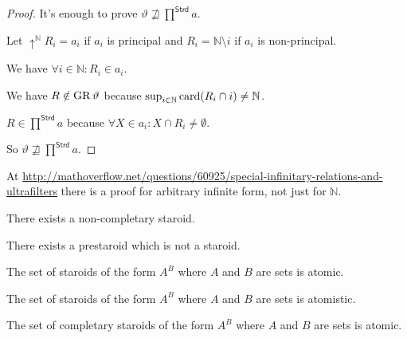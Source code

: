 \begin{proof}
It's enough to prove $\vartheta\nsqsupseteq\prod^{\mathsf{Strd}}a$.

Let $\uparrow^{\mathbb{N}}R_{i}=a_{i}$ if $a_{i}$ is principal and
$R_{i}=\mathbb{N}\setminus i$ if $a_{i}$ is non-principal.

We have $\forall i\in\mathbb{N}:R_{i}\in a_{i}$.

We have $R\notin\operatorname{GR}\vartheta$ because $\sup_{i\in\mathbb{N}}\operatorname{card}(R_{i}\cap i)\neq\mathbb{N}$.

$R\in\prod^{\mathsf{Strd}}a$ because $\forall X\in a_{i}:X\cap R_{i}\neq\emptyset$.

So $\vartheta\nsqsupseteq\prod^{\mathsf{Strd}}a$.\end{proof}
\begin{rem}
At \href{http://mathoverflow.net/questions/60925/special-infinitary-relations-and-ultrafilters}{http://mathoverflow.net/questions/60925/special-infinitary-relations-and-ultrafilters}
there is a proof for arbitrary infinite form, not just for $\mathbb{N}$.\end{rem}
\begin{conjecture}
There exists a non-completary staroid.
\end{conjecture}

\begin{conjecture}
There exists a prestaroid which is not a staroid.
\end{conjecture}

\begin{conjecture}
The set of staroids of the form $A^{B}$ where $A$ and $B$ are sets
is atomic.
\end{conjecture}

\begin{conjecture}
The set of staroids of the form $A^{B}$ where $A$ and $B$ are sets
is atomistic.
\end{conjecture}

\begin{conjecture}
The set of completary staroids of the form $A^{B}$ where $A$ and
$B$ are sets is atomic.
\end{conjecture}

